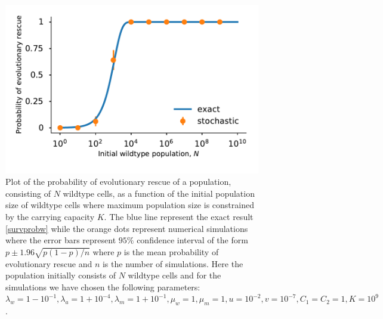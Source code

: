 \documentclass[12pt]{extarticle}
\begin{document}
\begin{figure}[p]
 \vspace*{1\baselineskip}
\includegraphics[width=1\textwidth]{Figures/SurvPlotNDataLogisticK.pdf}
\caption{Plot of the probability of evolutionary rescue of a population, consisting of $N$ wildtype cells, as a function of the initial population size of wildtype cells where maximum population size is constrained by the carrying capacity $K$.  The blue line represent the exact result \eqref{survprobw} while the orange dots represent numerical simulations where the error bars represent $95\%$ confidence interval of the form $p\pm1.96\sqrt{p\left(1-p\right)/n}$ where $p$ is the mean probability of evolutionary rescue and $n$ is the number of simulations. Here the population initially consists of $N$ wildtype cells and for the simulations we have chosen the following parameters: $\lambda_w=1-10^{-1},\lambda_a=1+10^{-4},\lambda_m=1+10^{-1},\mu_w=1,\mu_m=1,u=10^{-2},v=10^{-7}, C_1=C_2=1, K=10^9$.}
\label{rescue_prob_N_logistic}
\end{figure}
\end{document}

